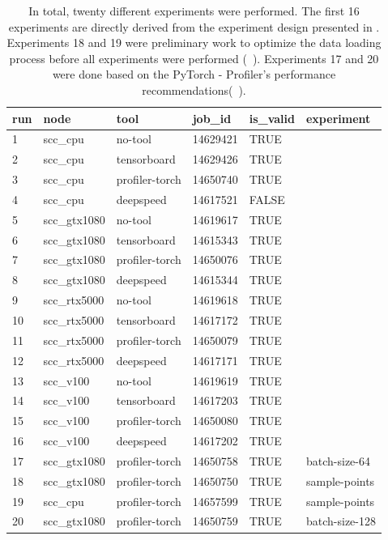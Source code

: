 \documentclass[12pt, a4paper, hidelinks]{article}
\begin{document}
\begin{table}[H]
\begin{tabular}{@{}llllll@{}}
\toprule
run & node         & tool           & job\_id  & is\_valid & experiment     \\ \midrule
1   & scc\_cpu     & no-tool        & 14629421 & TRUE      &                \\
2   & scc\_cpu     & tensorboard    & 14629426 & TRUE      &                \\
3   & scc\_cpu     & profiler-torch & 14650740 & TRUE      &                \\
4   & scc\_cpu     & deepspeed      & 14617521 & FALSE     &                \\
5   & scc\_gtx1080 & no-tool        & 14619617 & TRUE      &                \\
6   & scc\_gtx1080 & tensorboard    & 14615343 & TRUE      &                \\
7   & scc\_gtx1080 & profiler-torch & 14650076 & TRUE      &                \\
8   & scc\_gtx1080 & deepspeed      & 14615344 & TRUE      &                \\
9   & scc\_rtx5000 & no-tool        & 14619618 & TRUE      &                \\
10  & scc\_rtx5000 & tensorboard    & 14617172 & TRUE      &                \\
11  & scc\_rtx5000 & profiler-torch & 14650079 & TRUE      &                \\
12  & scc\_rtx5000 & deepspeed      & 14617171 & TRUE      &                \\
13  & scc\_v100    & no-tool        & 14619619 & TRUE      &                \\
14  & scc\_v100    & tensorboard    & 14617203 & TRUE      &                \\
15  & scc\_v100    & profiler-torch & 14650080 & TRUE      &                \\
16  & scc\_v100    & deepspeed      & 14617202 & TRUE      &                \\
17  & scc\_gtx1080 & profiler-torch & 14650758 & TRUE      & batch-size-64  \\
18  & scc\_gtx1080 & profiler-torch & 14650750 & TRUE      & sample-points  \\
19  & scc\_cpu     & profiler-torch & 14657599 & TRUE      & sample-points  \\
20  & scc\_gtx1080 & profiler-torch & 14650759 & TRUE      & batch-size-128 \\ \bottomrule
\end{tabular}
\caption[Overview of all runs]{In total, twenty different experiments were performed. The first 16 experiments are directly derived from the experiment design presented in . Experiments 18 and 19 were preliminary work to optimize the data loading process before all experiments were performed (~). Experiments 17 and 20 were done based on the PyTorch - Profiler's performance recommendations(~).}
\label{tab:experiments-all}
\end{table}
\end{document}

